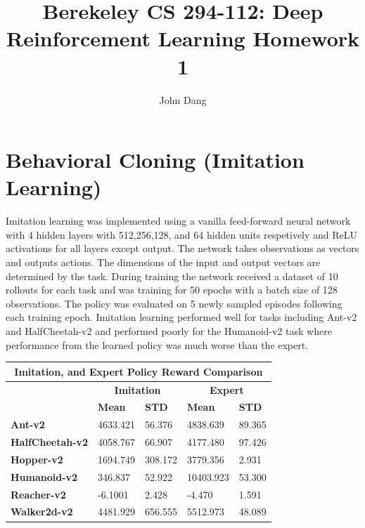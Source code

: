\documentclass{article}
\title{Berekeley CS 294-112: Deep Reinforcement Learning Homework 1}
\author{John Dang}
\date{}
\begin{document}
\maketitle
    \section{Behavioral Cloning (Imitation Learning)}
    Imitation learning was implemented using a vanilla 
    feed-forward neural network with 4 hidden layers with 
    512,256,128, and 64 hidden units respetively and ReLU 
    activations for all layers except output. The network takes 
    observations as vectors and outputs actions. The dimensions of 
    the input and output vectors are determined by the task.
    During training the network received a dataset of 10 rollouts for each 
    task and was training for 50 epochs with a batch size of 128 observations. 
    The policy was evaluated on 5 newly sampled episodes following each training 
    epoch. Imitation learning performed well for tasks including Ant-v2 and HalfCheetah-v2 and
    performed poorly for the Humanoid-v2 task where performance from the learned 
    policy was much worse than the expert.\\

    \begin{tabular}{ |p{3cm}||p{1.5cm}|p{1.5cm}|p{1.5cm}|p{1.5cm}| }
        \hline
        \multicolumn{5}{|c|}{\textbf{Imitation, and Expert Policy Reward Comparison}} \\
        \hline
        & \multicolumn{2}{|c|}{\textbf{Imitation}}  & \multicolumn{2}{|c|}{\textbf{Expert}} \\
        \cline{2-5}
        & \textbf{Mean} & \textbf{STD} & \textbf{Mean} & \textbf{STD} \\
        \hline
        \textbf{Ant-v2}         & 4633.421    & 56.376      & 4838.639      & 89.365 \\
        \hline
        \textbf{HalfCheetah-v2} & 4058.767    & 66.907      & 4177.480      & 97.426 \\
        \hline
        \textbf{Hopper-v2}      & 1694.749    & 308.172     & 3779.356      & 2.931 \\
        \hline
        \textbf{Humanoid-v2}    & 346.837     & 52.922      & 10403.923     & 53.300 \\
        \hline
        \textbf{Reacher-v2}     & -6.1001     & 2.428       & -4.470        & 1.591 \\
        \hline
        \textbf{Walker2d-v2}    & 4481.929    &656.555      & 5512.973      & 48.089\\
        \hline
    \end{tabular}
\end{document}
